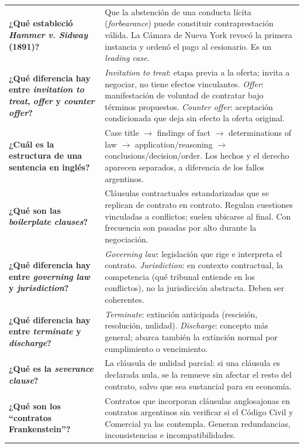 \documentclass[12pt,oneside]{book}
\begin{document}
\begin{longtable}{
    >{\raggedright\arraybackslash}p{}
    >{\raggedright\arraybackslash}p{}
}
\textbf{¿Qué estableció \textit{Hammer v. Sidway} (1891)?} &
Que la abstención de una conducta lícita (\textit{forbearance}) puede constituir contraprestación válida. La Cámara de Nueva York revocó la primera instancia y ordenó el pago al cesionario. Es un \textit{leading case}. \\

\textbf{¿Qué diferencia hay entre \textit{invitation to treat}, \textit{offer} y \textit{counter offer}?} &
\textit{Invitation to treat}: etapa previa a la oferta; invita a negociar, no tiene efectos vinculantes. \textit{Offer}: manifestación de voluntad de contratar bajo términos propuestos. \textit{Counter offer}: aceptación condicionada que deja sin efecto la oferta original. \\

\textbf{¿Cuál es la estructura de una sentencia en inglés?} &
Case title $\to$ findings of fact $\to$ determinations of law $\to$ application/reasoning $\to$ conclusions/decision/order. Los hechos y el derecho aparecen separados, a diferencia de los fallos argentinos. \\

\textbf{¿Qué son las \textit{boilerplate clauses}?} &
Cláusulas contractuales estandarizadas que se replican de contrato en contrato. Regulan cuestiones vinculadas a conflictos; suelen ubicarse al final. Con frecuencia son pasadas por alto durante la negociación. \\

\textbf{¿Qué diferencia hay entre \textit{governing law} y \textit{jurisdiction}?} &
\textit{Governing law}: legislación que rige e interpreta el contrato. \textit{Jurisdiction}: en contexto contractual, la competencia (qué tribunal entiende en los conflictos), no la jurisdicción abstracta. Deben ser coherentes. \\

\textbf{¿Qué diferencia hay entre \textit{terminate} y \textit{discharge}?} &
\textit{Terminate}: extinción anticipada (rescisión, resolución, nulidad). \textit{Discharge}: concepto más general; abarca también la extinción normal por cumplimiento o vencimiento. \\

\textbf{¿Qué es la \textit{severance clause}?} &
La cláusula de nulidad parcial: si una cláusula es declarada nula, se la remueve sin afectar el resto del contrato, salvo que sea sustancial para su economía. \\

\textbf{¿Qué son los ``contratos Frankenstein''?} &
Contratos que incorporan cláusulas anglosajonas en contratos argentinos sin verificar si el Código Civil y Comercial ya las contempla. Generan redundancias, inconsistencias e incompatibilidades. \\


\end{longtable}
\end{document}
